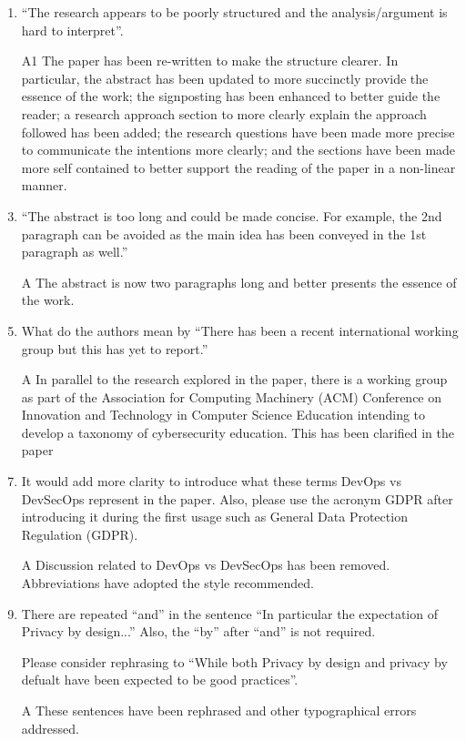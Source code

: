 \documentclass{article}
\begin{document}
\begin{enumerate}
\item ``The research appears to be poorly structured and the analysis/argument is hard to interpret''.
\item[A1]The paper has been re-written to  make the structure clearer. In particular, the abstract has been updated to more succinctly provide the essence of the work;  the signposting has been enhanced to better guide the reader;  a research approach section to more clearly explain the approach followed has been added;  the research questions have been made more precise to communicate the intentions more clearly; and the sections have been made more self contained to better support the reading of the paper in a non-linear manner.
\item ``The abstract is too long and could be made concise. For example, the 2nd paragraph can be avoided as the main idea has been conveyed in the 1st paragraph as well.''
\item[A] The abstract is now two paragraphs long and  better presents the essence of the work.
\item What do the authors mean by ``There has been a recent international working group but this has yet to report.'' 
\item[A] In parallel to the research explored in the paper, there is a working group as part of the Association for Computing Machinery (ACM) Conference on Innovation and Technology in Computer Science Education intending to develop a taxonomy of cybersecurity education. This has been clarified in the paper
\item It would add more clarity to introduce what these terms DevOps vs DevSecOps represent in the paper. Also, please use the acronym GDPR after introducing it during the first usage such as General Data Protection Regulation (GDPR). 
\item[A] Discussion related to DevOps vs DevSecOps has been removed. Abbreviations have adopted the style recommended. 
\item There are repeated ``and'' in the sentence ``In particular the expectation of Privacy by design...'' Also, the ``by'' after ``and'' is not required. 

Please consider rephrasing to ``While both Privacy by design and privacy by defualt have been expected to be good practices''.

\item[A] These sentences have been rephrased and other typographical errors addressed.


\end{enumerate}
\end{document}
